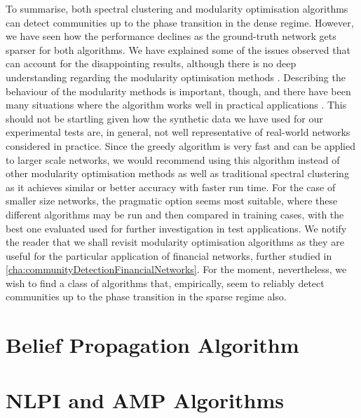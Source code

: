 To summarise, both spectral clustering and modularity optimisation algorithms can detect communities up to the phase transition in the dense regime.
However, we have seen how the performance declines as the ground-truth network gets sparser for both algorithms.
We have explained some of the issues observed that can account for the disappointing results, although there is no deep understanding regarding the modularity optimisation methods \cite{For10}.
Describing the behaviour of the modularity methods is important, though, and there have been many situations where the algorithm works well in practical applications \cite{New06a,New06b,For10,GMC10}.
This should not be startling given how the synthetic data we have used for our experimental tests are, in general, not well representative of real-world networks considered in practice.
Since the greedy algorithm is very fast and can be applied to larger scale networks, we would recommend using this algorithm instead of other modularity optimisation methods as well as traditional spectral clustering as it achieves similar or better accuracy with faster run time.
For the case of smaller size networks, the pragmatic option seems most suitable, where these different algorithms may be run and then compared in training cases, with the best one evaluated used for further investigation in test applications.
We notify the reader that we shall revisit modularity optimisation algorithms as they are useful for the particular application of financial networks, further studied in \cref{cha:communityDetectionFinancialNetworks}.
For the moment, nevertheless, we wish to find a class of algorithms that, empirically, seem to reliably detect communities up to the phase transition in the sparse regime also.


\section{Belief Propagation Algorithm}
\label{sec:beliefPropagationAlgorithmTest}


\section{NLPI and AMP Algorithms}
\label{sec:NLPIAndAMPAlgorithms}

